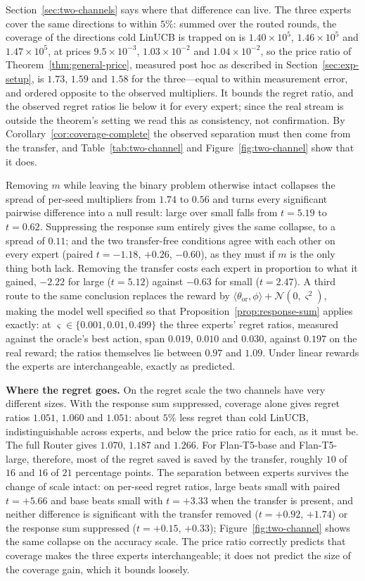 \documentclass{article}
\theoremstyle{definition}
\theoremstyle{remark}
\theoremstyle{remark}
\begin{document}
Section~\ref{sec:two-channels} says where that difference can live. The three
experts cover the same directions to within $5\%$: summed over the routed
rounds, the coverage of the directions cold LinUCB is trapped on is
$1.40\times10^5$, $1.46\times10^5$ and $1.47\times10^5$, at prices
$9.5\times10^{-3}$, $1.03\times10^{-2}$ and $1.04\times10^{-2}$, so the price
ratio of Theorem~\ref{thm:general-price}, measured post hoc as described in
Section~\ref{sec:exp-setup}, is $1.73$, $1.59$ and $1.58$ for the
three---equal to within measurement error, and ordered opposite to the observed
multipliers. It bounds the regret ratio, and the observed regret ratios lie
below it for every expert; since the real stream is outside the theorem's
setting we read this as consistency, not confirmation. By Corollary~\ref{cor:coverage-complete} the observed
separation must then come from the transfer, and
Table~\ref{tab:two-channel} and Figure~\ref{fig:two-channel} show that it
does.

Removing $m$ while leaving the binary problem otherwise intact collapses the
spread of per-seed multipliers from $1.74$ to $0.56$ and turns every
significant pairwise difference into a null result: large over small falls
from $t=5.19$ to $t=0.62$. Suppressing the response sum entirely gives the
same collapse, to a spread of $0.11$; and the two transfer-free conditions
agree with each other on every expert (paired $t=-1.18$, $+0.26$, $-0.60$),
as they must if $m$ is the only thing both lack. Removing the transfer costs
each expert in proportion to what it gained, $-2.22$ for large ($t=5.12$)
against $-0.63$ for small ($t=2.47$). A third route to the same conclusion
replaces the reward by $\langle\theta_{\mathrm{or}},\phi\rangle+\mathcal
N(0,\varsigma^2)$, making the model well specified so that
Proposition~\ref{prop:response-sum} applies exactly: at
$\varsigma\in\{0.001,0.01,0.499\}$ the three experts' regret ratios, measured
against the oracle's best action, span $0.019$, $0.010$ and $0.030$, against
$0.197$ on the real reward; the ratios themselves lie between $0.97$ and
$1.09$. Under linear rewards the experts are interchangeable, exactly as
predicted.

\textbf{Where the regret goes.} On the regret scale the two channels have
very different sizes. With the response sum suppressed, coverage alone gives
regret ratios $1.051$, $1.060$ and $1.051$: about $5\%$ less regret than cold
LinUCB, indistinguishable across experts, and below the price ratio for each,
as it must be. The full Router gives $1.070$, $1.187$ and $1.266$. For
Flan-T5-base and Flan-T5-large, therefore, most of the regret saved is saved
by the transfer, roughly $10$ of $16$ and $16$ of $21$ percentage points. The
separation between experts survives the change of scale intact: on per-seed
regret ratios, large beats small with paired $t=+5.66$ and base beats small
with $t=+3.33$ when the transfer is present, and neither difference is
significant with the transfer removed ($t=+0.92$, $+1.74$) or the response sum
suppressed ($t=+0.15$, $+0.33$); Figure~\ref{fig:two-channel} shows the same
collapse on the accuracy scale. The price ratio correctly predicts that
coverage makes the three experts interchangeable; it does not predict the size
of the coverage gain, which it bounds loosely.
\end{document}
